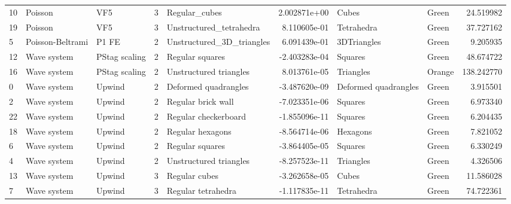 \begin{tabular}{lllrlrllr}
10 &           Poisson &                   VF5 &               3 &                   Regular\_cubes &  2.002871e+00 &                 Cubes &                                Green &           24.519982 \\
19 &           Poisson &                   VF5 &               3 &         Unstructured\_tetrahedra &  8.110605e-01 &            Tetrahedra &                                Green &           37.727162 \\
5  &  Poisson-Beltrami &                 P1 FE &               2 &       Unstructured\_3D\_triangles &  6.091439e-01 &           3DTriangles &                                Green &            9.205935 \\
12 &       Wave system &         PStag scaling &               2 &                 Regular squares & -2.403283e-04 &               Squares &                                Green &           48.674722 \\
16 &       Wave system &         PStag scaling &               2 &          Unstructured triangles &  8.013761e-05 &             Triangles &                               Orange &          138.242770 \\
0  &       Wave system &                Upwind &               2 &            Deformed quadrangles & -3.487620e-09 &  Deformed quadrangles &                                Green &            3.915501 \\
2  &       Wave system &                Upwind &               2 &              Regular brick wall & -7.023351e-06 &               Squares &                                Green &            6.973340 \\
22 &       Wave system &                Upwind &               2 &            Regular checkerboard & -1.855096e-11 &               Squares &                                Green &            6.204435 \\
18 &       Wave system &                Upwind &               2 &                Regular hexagons & -8.564714e-06 &              Hexagons &                                Green &            7.821052 \\
6  &       Wave system &                Upwind &               2 &                 Regular squares & -3.864405e-05 &               Squares &                                Green &            6.330249 \\
4  &       Wave system &                Upwind &               2 &          Unstructured triangles & -8.257523e-11 &             Triangles &                                Green &            4.326506 \\
13 &       Wave system &                Upwind &               3 &                   Regular cubes & -3.262658e-05 &                 Cubes &                                Green &           11.586028 \\
7  &       Wave system &                Upwind &               3 &              Regular tetrahedra & -1.117835e-11 &            Tetrahedra &                                Green &           74.722361 \\
\bottomrule
\end{tabular}
